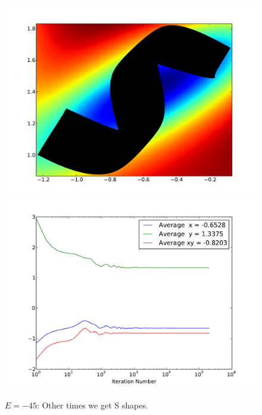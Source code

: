 \documentclass[letterpaper]{article}
\begin{document}
\begin{figure}[p]
\begin{center}
\includegraphics[width=5in]{p4.pdf}
\includegraphics[width=5in]{p4a.pdf}
\end{center}
\caption{$E=-45$: Other times we get S shapes.}
\label{fig:p4}
\end{figure}
\end{document}
